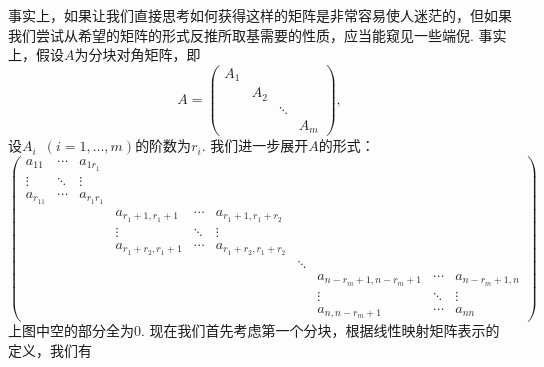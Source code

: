 事实上，如果让我们直接思考如何获得这样的矩阵是非常容易使人迷茫的，但如果我们尝试从希望的矩阵的形式反推所取基需要的性质，应当能窥见一些端倪. 事实上，假设$A$为分块对角矩阵，即
\[A=\begin{pmatrix}
        A_1 &     &        &     \\
            & A_2 &        &     \\
            &     & \ddots &     \\
            &     &        & A_m
    \end{pmatrix},\]
设$A_i\enspace(i=1,\ldots,m)$的阶数为$r_i$. 我们进一步展开$A$的形式：
\[\begin{pmatrix}
        a_{11}   & \cdots & a_{1r_1}   &                   &        &                     &        &                     &        &               \\
        \vdots   & \ddots & \vdots     &                   &        &                     &        &                     &        &               \\
        a_{r_11} & \cdots & a_{r_1r_1} &                   &        &                     &        &                     &        &               \\
                 &        &            & a_{r_1+1,r_1+1}   & \cdots & a_{r_1+1,r_1+r_2}   &        &                     &        &               \\
                 &        &            & \vdots            & \ddots & \vdots              &        &                     &        &               \\
                 &        &            & a_{r_1+r_2,r_1+1} & \cdots & a_{r_1+r_2,r_1+r_2} &        &                     &        &               \\
                 &        &            &                   &        &                     & \ddots &                     &        &               \\
                 &        &            &                   &        &                     &        & a_{n-r_m+1,n-r_m+1} & \cdots & a_{n-r_m+1,n} \\
                 &        &            &                   &        &                     &        & \vdots              & \ddots & \vdots        \\
                 &        &            &                   &        &                     &        & a_{n,n-r_m+1}       & \cdots & a_{nn}
    \end{pmatrix}\]
上图中空的部分全为$0$. 现在我们首先考虑第一个分块，根据线性映射矩阵表示的定义，我们有
